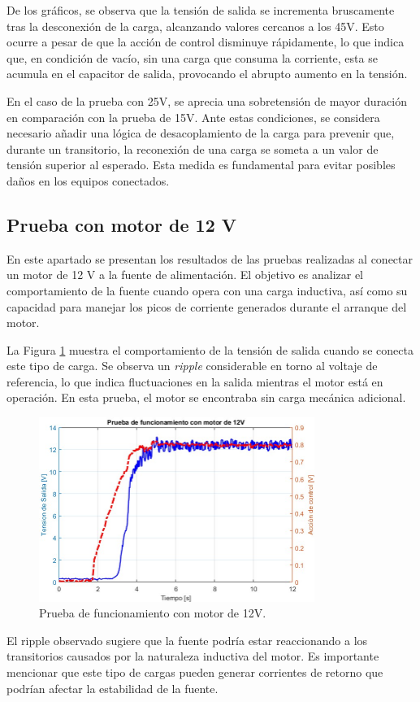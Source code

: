 De los gráficos, se observa que la tensión de salida se incrementa bruscamente tras la desconexión de la carga, alcanzando valores cercanos a los 45V. Esto ocurre a pesar de que la acción de control disminuye rápidamente, lo que indica que, en condición de vacío, sin una carga que consuma la corriente, esta se acumula en el capacitor de salida, provocando el abrupto aumento en la tensión. \par
En el caso de la prueba con 25V, se aprecia una sobretensión de mayor duración en comparación con la prueba de 15V. Ante estas condiciones, se considera necesario añadir una lógica de desacoplamiento de la carga para prevenir que, durante un transitorio, la reconexión de una carga se someta a un valor de tensión superior al esperado. Esta medida es fundamental para evitar posibles daños en los equipos conectados. \par 

\subsection{Prueba con motor de 12 V}
En este apartado se presentan los resultados de las pruebas realizadas al conectar un motor de 12 V a la fuente de alimentación. El objetivo es analizar el comportamiento de la fuente cuando opera con una carga inductiva, así como su capacidad para manejar los picos de corriente generados durante el arranque del motor. \par 
La Figura \ref{F:Motor12} muestra el comportamiento de la tensión de salida cuando se conecta este tipo de carga. Se observa un \textit{ripple} considerable en torno al voltaje de referencia, lo que indica fluctuaciones en la salida mientras el motor está en operación. En esta prueba, el motor se encontraba sin carga mecánica adicional. \par 
\begin{figure}[htbp]
    \centering
    \includegraphics[width=0.8\textwidth]{./imagenes/Motor2.jpg}
    \caption{Prueba de funcionamiento con motor de 12V.}
    \label{F:Motor12}
\end{figure}\par 
El ripple observado sugiere que la fuente podría estar reaccionando a los transitorios causados por la naturaleza inductiva del motor. Es importante mencionar que este tipo de cargas pueden generar corrientes de retorno que podrían afectar la estabilidad de la fuente. \par 

